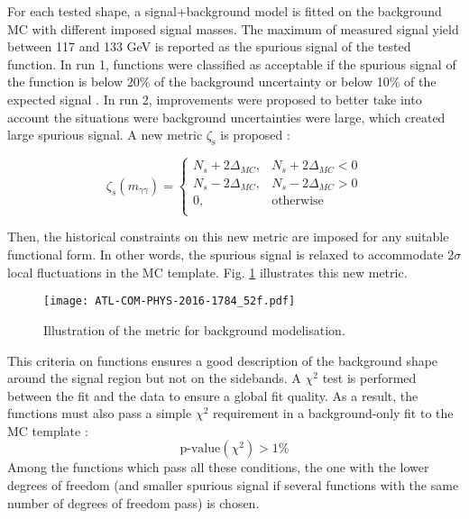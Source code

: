 \begin{enumerate}
\begin{enumerate}
For each tested shape, a signal+background model is fitted on the background MC with different imposed signal masses.
The maximum of measured signal yield between 117 and 133 GeV is reported as the spurious signal of the tested function.
In run 1, functions were classified as acceptable if the spurious signal of the function is below 20\% of the background uncertainty or below 10\% of the expected signal \cite{ATLAS-CONF-2012-091}.
In run 2, improvements were proposed \cite{ATL-COM-PHYS-2016-1784} to better take into account the situations were background uncertainties were large, which created large spurious signal.
A new metric \(\zeta_{\text{s}}\) is proposed :

\begin{equation}
\zeta_{s}(m_{\gamma\gamma}) =
\left\{
\begin{array}{ll}
N_s + 2\Delta_{MC},   &   N_s + 2\Delta_{MC} < 0 \\
N_s - 2\Delta_{MC},   &   N_s - 2\Delta_{MC} > 0 \\
0                   ,&\text{otherwise}          \\
\end{array}
\right.
\label{eq:relaxed_spurious_signal}
\end{equation}

Then, the historical constraints on this new metric are imposed for any suitable functional form.
In other words, the spurious signal is relaxed to accommodate 2$\sigma$ local fluctuations in the MC template.
Fig. \ref{fig:HGam_spuriousMetric} illustrates this new metric.

\begin{figure}[htbp]
\centering
\texttt{[image: ATL-COM-PHYS-2016-1784\_52f.pdf]}
\caption{\label{fig:HGam_spuriousMetric}
Illustration of the metric for background modelisation. \cite{ATL-COM-PHYS-2016-1784}}
\end{figure}


This criteria on functions ensures a good description of the background shape around the signal region but not on the sidebands.
A \(\chi^{\text{2}}\) test is performed between the fit and the data to ensure a global fit quality.
As a result, the functions must also pass a simple $\chi^2$ requirement in a background-only fit to the MC template :
\begin{equation}
\text{p-value}(\chi^2)>1\%
\end{equation}
Among the functions which pass all these conditions, the one with the lower degrees of freedom (and smaller spurious signal if several functions with the same number of degrees of freedom pass) is chosen.



\end{enumerate}
\end{enumerate}
